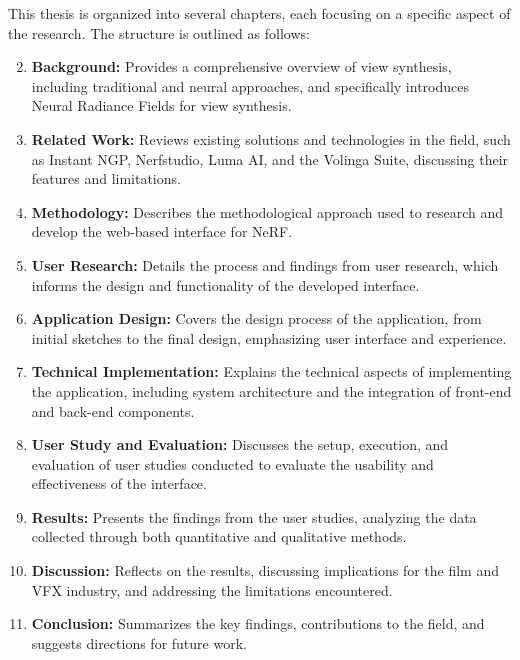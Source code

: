 This thesis is organized into several chapters, each focusing on a specific aspect of the research.
The structure is outlined as follows:

\begin{enumerate}
    \setcounter{enumi}{1}
    \item \textbf{Background:} Provides a comprehensive overview of view synthesis, including traditional and neural approaches, and specifically introduces Neural Radiance Fields for view synthesis.
    \item \textbf{Related Work:} Reviews existing solutions and technologies in the field, such as Instant NGP, Nerfstudio, Luma AI, and the Volinga Suite, discussing their features and limitations.
    \item \textbf{Methodology:} Describes the methodological approach used to research and develop the web-based interface for NeRF.
    \item \textbf{User Research:} Details the process and findings from user research, which informs the design and functionality of the developed interface.
    \item \textbf{Application Design:} Covers the design process of the application, from initial sketches to the final design, emphasizing user interface and experience.
    \item \textbf{Technical Implementation:} Explains the technical aspects of implementing the application, including system architecture and the integration of front-end and back-end components.
    \item \textbf{User Study and Evaluation:} Discusses the setup, execution, and evaluation of user studies conducted to evaluate the usability and effectiveness of the interface.
    \item \textbf{Results:} Presents the findings from the user studies, analyzing the data collected through both quantitative and qualitative methods.
    \item \textbf{Discussion:} Reflects on the results, discussing implications for the film and VFX industry, and addressing the limitations encountered.
    \item \textbf{Conclusion:} Summarizes the key findings, contributions to the field, and suggests directions for future work.
\end{enumerate}
